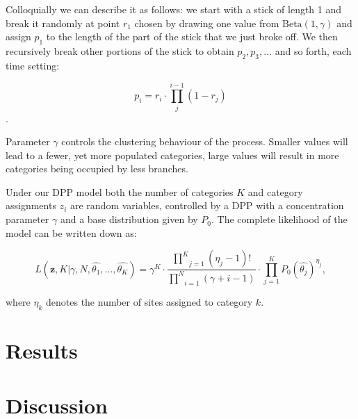 Colloquially we can describe it as follows: we start with a stick of length 1 and break it randomly at point $r_{1}$ chosen by drawing one value from $\text{Beta}(1, \gamma)$ and assign $p_{1}$ to the length of the part of the stick that we just broke off.
We then recursively break other portions of the stick to obtain $p_{2}, p_{3}, \ldots$ and so forth, each time setting:

$$p_{i}=r_{i}\cdot\underset{j}{\overset{i-1}{\prod}}\left(1-r_{j}\right)$$.

\noindent
Parameter $\gamma$ controls the clustering behaviour of the process.
Smaller values will lead to a fewer, yet more populated categories, large values will result in more categories being occupied by less branches.

Under our DPP model both the number of categories $K$ and category assignments $z_{i}$ are random variables, controlled by a DPP with a concentration parameter $\gamma$ and a base distribution given by $P_{0}$.
The complete likelihood of the model can be written down as:

\begin{equation}
L(\mathbf{z},K|\gamma,N,\hat{\theta_{1}},\ldots,\hat{\theta_{K}})=\gamma^{K}\cdot\frac{\underset{j=1}{\overset{K}{\prod}}\left(\eta_{j}-1\right)!}{\underset{i=1}{\overset{N}{\prod}}\left(\gamma+i-1\right)}\cdot\underset{j=1}{\overset{K}{\prod}}P_{0}\left(\hat{\theta_{j}}\right)^{\eta_{j}},
\label{eq:dppLike} 
\end{equation} 

\noindent 
where $\eta_{k}$ denotes the number of sites assigned to category $k$.

\section{Results}




\section{Discussion}



